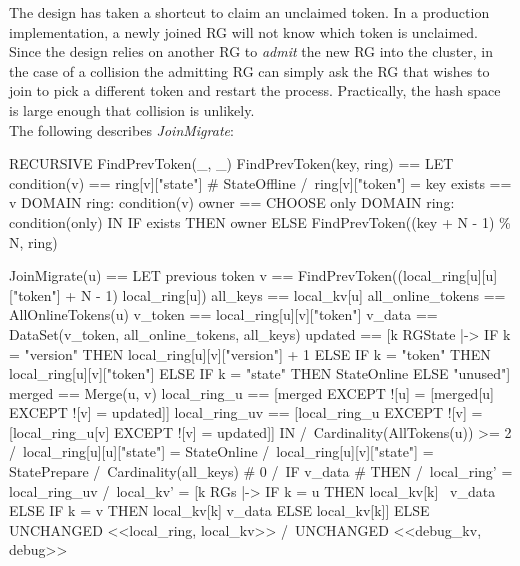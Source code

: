 The design has taken a shortcut to claim an unclaimed token. In a production
implementation, a newly joined RG will not know which token is unclaimed. Since
the design relies on another RG to \textit{admit} the new RG into the cluster,
in the case of a collision the admitting RG can simply ask the RG that wishes to
join to pick a different token and restart the process. Practically, the hash
space is large enough that collision is unlikely.\\


The following describes \textit{JoinMigrate}:\\
\begin{tla}
RECURSIVE FindPrevToken(_, _)
FindPrevToken(key, ring) ==
    LET 
        condition(v) == ring[v]["state"] # StateOffline 
                    /\ ring[v]["token"] = key
        exists == \E v \in DOMAIN ring: condition(v)
        owner == CHOOSE only \in DOMAIN ring: condition(only)
    IN 
        IF exists THEN
            owner
        ELSE 
            FindPrevToken((key + N - 1) \% N, ring)

JoinMigrate(u) == 
    LET 
        \* previous token
        v == FindPrevToken((local_ring[u][u]["token"] + N - 1) %
                            local_ring[u])
        all_keys == local_kv[u]
        all_online_tokens == AllOnlineTokens(u)
        v_token == local_ring[u][v]["token"]
        v_data == DataSet(v_token, all_online_tokens, all_keys)
        updated == [k \in RGState |-> 
                            IF k = "version" THEN local_ring[u][v]["version"] + 1
                            ELSE IF k = "token" THEN local_ring[u][v]["token"]
                            ELSE IF k = "state" THEN StateOnline
                            ELSE "unused"]
        merged == Merge(u, v)
        local_ring_u == [merged EXCEPT ![u] 
                            = [merged[u] EXCEPT ![v] = updated]]
        local_ring_uv == [local_ring_u EXCEPT ![v] 
                            = [local_ring_u[v] EXCEPT ![v] = updated]]
    IN 
        /\ Cardinality(AllTokens(u)) >= 2
        /\ local_ring[u][u]["state"] = StateOnline
        /\ local_ring[u][v]["state"] = StatePrepare
        /\ Cardinality(all_keys) # 0
        /\ IF v_data # {} THEN 
                /\ local_ring' = local_ring_uv
                /\ local_kv' = [k \in RGs |-> 
                                IF k = u THEN local_kv[k] \ v_data
                                ELSE IF k = v THEN local_kv[k] \cup v_data
                                ELSE local_kv[k]]
            ELSE 
                UNCHANGED <<local_ring, local_kv>>
        /\ UNCHANGED <<debug_kv, debug>>
\end{tla}

